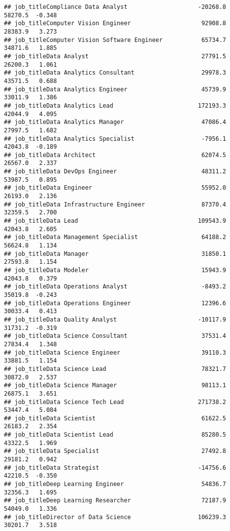 \documentclass[
]{article}
\begin{document}
\begin{verbatim}
## job_titleCompliance Data Analyst                    -20268.8    58270.5  -0.348
## job_titleComputer Vision Engineer                    92908.8    28383.9   3.273
## job_titleComputer Vision Software Engineer           65734.7    34871.6   1.885
## job_titleData Analyst                                27791.5    26200.3   1.061
## job_titleData Analytics Consultant                   29978.3    43571.5   0.688
## job_titleData Analytics Engineer                     45739.9    33011.9   1.386
## job_titleData Analytics Lead                        172193.3    42044.9   4.095
## job_titleData Analytics Manager                      47086.4    27997.5   1.682
## job_titleData Analytics Specialist                   -7956.1    42043.8  -0.189
## job_titleData Architect                              62074.5    26567.0   2.337
## job_titleData DevOps Engineer                        48311.2    53987.5   0.895
## job_titleData Engineer                               55952.0    26193.0   2.136
## job_titleData Infrastructure Engineer                87370.4    32359.5   2.700
## job_titleData Lead                                  109543.9    42043.8   2.605
## job_titleData Management Specialist                  64188.2    56624.8   1.134
## job_titleData Manager                                31850.1    27593.8   1.154
## job_titleData Modeler                                15943.9    42043.8   0.379
## job_titleData Operations Analyst                     -8493.2    35019.8  -0.243
## job_titleData Operations Engineer                    12396.6    30033.4   0.413
## job_titleData Quality Analyst                       -10117.9    31731.2  -0.319
## job_titleData Science Consultant                     37531.4    27834.4   1.348
## job_titleData Science Engineer                       39110.3    33881.5   1.154
## job_titleData Science Lead                           78321.7    30872.0   2.537
## job_titleData Science Manager                        98113.1    26875.1   3.651
## job_titleData Science Tech Lead                     271738.2    53447.4   5.084
## job_titleData Scientist                              61622.5    26183.2   2.354
## job_titleData Scientist Lead                         85280.5    43322.5   1.969
## job_titleData Specialist                             27492.8    29181.2   0.942
## job_titleData Strategist                            -14756.6    42210.5  -0.350
## job_titleDeep Learning Engineer                      54836.7    32356.3   1.695
## job_titleDeep Learning Researcher                    72187.9    54049.0   1.336
## job_titleDirector of Data Science                   106239.3    30201.7   3.518

\end{verbatim}
\end{document}
